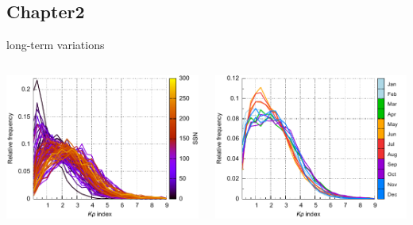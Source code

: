 \subsection{Chapter2}

\begin{frame}[plain,c]{\Kp{} long-term variations}{}
	\begin{columns}[c]
		
		\includegraphics[width=\textwidth]{../figures_of_mine/chapter2/Kp_histogram_yearlySSN_b.pdf}
		
		
		\includegraphics[width=\textwidth]{../figures_of_mine/chapter2/Kp_histogram_monthly.pdf}
	\end{columns}
\end{frame}

